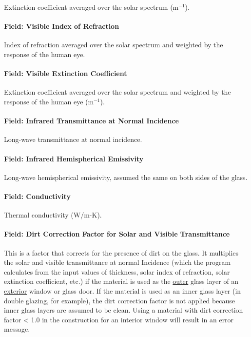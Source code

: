 Extinction coefficient averaged over the solar spectrum (m\(^{-1}\)).

\paragraph{Field: Visible Index of Refraction}\label{field-visible-index-of-refraction}

Index of refraction averaged over the solar spectrum and weighted by the response of the human eye.

\paragraph{Field: Visible Extinction Coefficient}\label{field-visible-extinction-coefficient}

Extinction coefficient averaged over the solar spectrum and weighted by the response of the human eye (m\(^{-1}\)).

\paragraph{Field: Infrared Transmittance at Normal Incidence}\label{field-infrared-transmittance-at-normal-incidence-1}

Long-wave transmittance at normal incidence.

\paragraph{Field: Infrared Hemispherical Emissivity}\label{field-infrared-hemispherical-emissivity}

Long-wave hemispherical emissivity, assumed the same on both sides of the glass.

\paragraph{Field: Conductivity}\label{field-conductivity-2}

Thermal conductivity (W/m-K).

\paragraph{Field: Dirt Correction Factor for Solar and Visible Transmittance}\label{field-dirt-correction-factor-for-solar-and-visible-transmittance-1}

This is a factor that corrects for the presence of dirt on the glass. It multiplies the solar and visible transmittance at normal Incidence (which the program calculates from the input values of thickness, solar index of refraction, solar extinction coefficient, etc.) if the material is used as the \underline{outer} glass layer of an \underline{exterior} window or glass door. If the material is used as an inner glass layer (in double glazing, for example), the dirt correction factor is not applied because inner glass layers are assumed to be clean. Using a material with dirt correction factor \textless{} 1.0 in the construction for an interior window will result in an error message.


